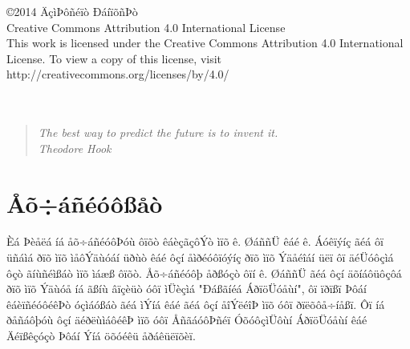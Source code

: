 \documentclass[12pt, twoside, a4paper]{book}
\newcommand{\tl}[1]{\textlatin{#1}}
\begin{document}
\vspace{55ex}
\copyright 2014 ÄçìÞôñéïò ÐáíïõñÞò\\
\tl{Creative Commons Attribution 4.0 International License} \\
\tl{This work is licensed under the Creative Commons Attribution 4.0 International License. To view a copy of this license, visit http://creativecommons.org/licenses/by/4.0/}\\
\\
\\
\begin{figure}[h]
\end{figure}

\newpage\null\thispagestyle{empty}\newpage
    
\cleardoublepage
\thispagestyle{empty}
\hspace{10pt}

\vspace{20ex}
\noindent
 \begin{quotation}
\textit{\tl{The best way to predict the future is to invent it.} \\
	\tl{Theodore Hook}}
 \end{quotation}

\newpage\null\thispagestyle{empty}\newpage
    
\cleardoublepage

\setcounter{page}{1}
\chapter*{Åõ÷áñéóôßåò}

Èá Þèåëá íá åõ÷áñéóôÞóù ôïõò êáèçãçôÝò ìïõ ê. ØáññÜ êáé ê. Áóêïýíç ãéá ôï üñáìá ðïõ ìïõ ìåôÝäùóáí üðùò êáé ôçí åìðéóôïóýíç ðïõ ìïõ Ýäåéîáí üëï ôï äéÜóôçìá ôçò ãíùñéìßáò ìïõ ìáæß ôïõò. Åõ÷áñéóôþ åðßóçò ôïí ê. ØáññÜ ãéá ôçí äõíáôüôçôá ðïõ ìïõ Ýäùóå íá ãßíù âïçèüò óôï ìÜèçìá \tl{"}Ðáßãíéá ÁðïöÜóåùí\tl{"}, ôï ïðïßï Þôáí êáèïñéóôéêÞò óçìáóßáò ãéá ìÝíá êáé ãéá ôçí åîÝëéîÞ ìïõ óôï ðïëõôå÷íåßï. Ôï íá ðåñáôþóù ôçí äéðëùìáôéêÞ ìïõ óôï ÅñãáóôÞñéï ÓõóôçìÜôùí ÁðïöÜóåùí êáé Äéïßêçóçò Þôáí Ýíá öõóéêü åðáêüëïõèï.
\end{document}
